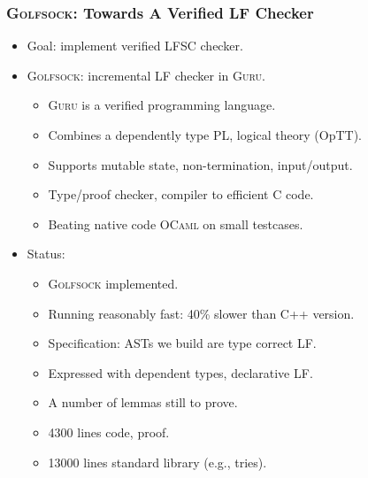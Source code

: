 \documentclass[11pt]{beamer}
\begin{document}
\begin{frame}
\frametitle{\textsc{Golfsock}: Towards A Verified LF Checker}
\begin{itemize}
\item Goal: implement verified LFSC checker.
\item \textsc{Golfsock}: incremental LF checker in \textsc{Guru}.
\begin{itemize}
\item \textsc{Guru} is a verified programming language.
\item Combines a dependently type PL, logical theory (OpTT).
\item Supports mutable state, non-termination, input/output.
\item Type/proof checker, compiler to efficient C code.
\item Beating native code \textsc{OCaml} on small testcases.
\end{itemize}
\item Status:
\begin{itemize}
\item \textsc{Golfsock} implemented.
\item Running reasonably fast: 40\% slower than C++ version.
\item Specification: ASTs we build are type correct LF.
\item Expressed with dependent types, declarative LF.
\item A number of lemmas still to prove.
\item 4300 lines code, proof.
\item 13000 lines standard library (e.g., tries).
\end{itemize}
\end{itemize}
\end{frame}
\end{document}
